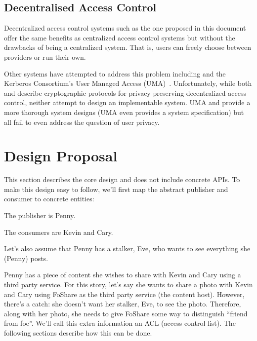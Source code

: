 \documentclass[pdftex,12pt,a4papaer]{article}
\begin{document}
\subsection{Decentralised Access Control}

Decentralized access control systems such as the one proposed in this document
offer the same benefits as centralized access control systems but without the
drawbacks of being a centralized system. That is, users can freely choose
between providers or run their own. 

Other systems have attempted to address this problem including \cite{attrib}
\cite{privattrib} \cite{drbac} \cite{socnet} and the Kerberos Consortium's User
Managed Access (UMA)~\cite{uma}. Unfortunately, while both \cite{attrib} and
\cite{privattrib} describe cryptographic protocols for privacy preserving
decentralized access control, neither attempt to design an implementable system.
UMA\cite{uma} \cite{drbac} and \cite{socnet} provide a more thorough system
designs (UMA even provides a system specification) but all fail to even address
the question of user privacy.

\section{Design Proposal}

This section describes the core design and does not include concrete APIs. To
make this design easy to follow, we'll first map the abstract publisher and
consumer to concrete entities:

\begin{compactitem}
    \item The publisher is Penny.
    \item The consumers are Kevin and Cary.
\end{compactitem}

Let's also assume that Penny has a stalker, Eve, who wants to see everything she
(Penny) posts.

Penny has a piece of content she wishes to share with Kevin and Cary using a
third party service. For this story, let's say she wants to share a photo with
Kevin and Cary using FoShare as the third party service (the content host).
However, there's a catch: she doesn't want her stalker, Eve, to see the photo.
Therefore, along with her photo, she needs to give FoShare some way to
distinguish ``friend from foe''. We'll call this extra information an ACL (access
control list). The following sections describe how this can be done.
\end{document}
